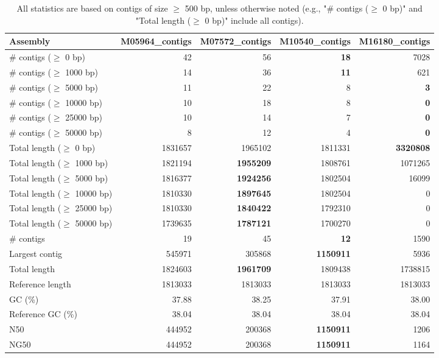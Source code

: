 \documentclass[12pt,a4paper]{article}
\begin{document}
\begin{table}[ht]
\begin{center}
\caption{All statistics are based on contigs of size $\geq$ 500 bp, unless otherwise noted (e.g., "\# contigs ($\geq$ 0 bp)" and "Total length ($\geq$ 0 bp)" include all contigs).}
\begin{tabular}{|l*{4}{|r}|}
\hline
Assembly & M05964\_contigs & M07572\_contigs & M10540\_contigs & M16180\_contigs \\ \hline
\# contigs ($\geq$ 0 bp) & 42 & 56 & {\bf 18} & 7028 \\ \hline
\# contigs ($\geq$ 1000 bp) & 14 & 36 & {\bf 11} & 621 \\ \hline
\# contigs ($\geq$ 5000 bp) & 11 & 22 & 8 & {\bf 3} \\ \hline
\# contigs ($\geq$ 10000 bp) & 10 & 18 & 8 & {\bf 0} \\ \hline
\# contigs ($\geq$ 25000 bp) & 10 & 14 & 7 & {\bf 0} \\ \hline
\# contigs ($\geq$ 50000 bp) & 8 & 12 & 4 & {\bf 0} \\ \hline
Total length ($\geq$ 0 bp) & 1831657 & 1965102 & 1811331 & {\bf 3320808} \\ \hline
Total length ($\geq$ 1000 bp) & 1821194 & {\bf 1955209} & 1808761 & 1071265 \\ \hline
Total length ($\geq$ 5000 bp) & 1816377 & {\bf 1924256} & 1802504 & 16099 \\ \hline
Total length ($\geq$ 10000 bp) & 1810330 & {\bf 1897645} & 1802504 & 0 \\ \hline
Total length ($\geq$ 25000 bp) & 1810330 & {\bf 1840422} & 1792310 & 0 \\ \hline
Total length ($\geq$ 50000 bp) & 1739635 & {\bf 1787121} & 1700270 & 0 \\ \hline
\# contigs & 19 & 45 & {\bf 12} & 1590 \\ \hline
Largest contig & 545971 & 305868 & {\bf 1150911} & 5936 \\ \hline
Total length & 1824603 & {\bf 1961709} & 1809438 & 1738815 \\ \hline
Reference length & 1813033 & 1813033 & 1813033 & 1813033 \\ \hline
GC (\%) & 37.88 & 38.25 & 37.91 & 38.00 \\ \hline
Reference GC (\%) & 38.04 & 38.04 & 38.04 & 38.04 \\ \hline
N50 & 444952 & 200368 & {\bf 1150911} & 1206 \\ \hline
NG50 & 444952 & 200368 & {\bf 1150911} & 1164 \\ \hline

\end{tabular}
\end{center}
\end{table}
\end{document}

